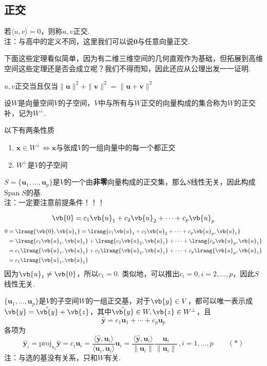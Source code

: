 \subsection{正交}
\begin{definition}[正交]
若$\langle u,v\rangle=0$，则称$u,v$正交.\\
注：与高中的定义不同，这里我们可以说$\mathbf{0}$与任意向量正交.
\end{definition}
下面这些定理看似简单，因为有二维三维空间的几何直观作为基础，但拓展到高维空间这些定理还是否会成立呢？我们不得而知，因此还应从公理出发一一证明.
\begin{theorem}
$u,v$正交当且仅当$\|\mathbf{u}\|^2+\|\mathbf{v}\|^2=\|\mathbf{u}+\mathbf{v}\|^2$
\end{theorem}
\begin{definition}
设$W$是向量空间$V$的子空间，$V$中与所有与$W$正交的向量构成的集合称为$W$的正交补，记为$W^\perp$.
\end{definition}
以下有两条性质
\begin{enumerate}
	\itemsep -3pt
	\item $\mathbf{x}\in W^\perp\iff\mathbf{x}$与张成$V$的一组向量中的每一个都正交
	\item $W^\perp$是$V$的子空间
\end{enumerate}
\begin{theorem}[正交必定线性无关]
\label{ortho_indep}
$S=\{\mathbf{u}_1,\dots,\mathbf{u}_p\}$是$V$的一个由\textbf{非零}向量构成的正交集，那么$S$线性无关，因此构成$\mathrm{Span}\;S$的基.\\
注：一定要注意前提条件！！！
\end{theorem}
\begin{analysis}
\[\vb{0}=c_1\vb{u}_1+c_2\vb{u}_2+\cdots+c_p\vb{u}_p\]
\[\begin{aligned}0&=\lrang{\vb{0},\vb{u}_1}=\lrang{c_1\vb{u}_1+c_2\vb{u}_2+\cdots+c_p\vb{u}_p,\vb{u}_1}\\
&=\lrang{c_1\vb{u}_1,\vb{u}_1}+\lrang{c_2\vb{u}_2,\vb{u}_1}+\cdots+\lrang{c_p\vb{u}_p,\vb{u}_1}\\
&=c_1\lrang{\vb{u}_1,\vb{u}_1}+c_2\lrang{\vb{u}_2,\vb{u}_1}+\cdots+c_p\lrang{\vb{u}_p,\vb{u}_1}\\
&=c_1\lrang{\vb{u}_1,\vb{u}_1}
\end{aligned}\]
因为$\vb{u}_1\ne\vb{0}$，所以$c_1=0$. 类似地，可以推出$c_i=0,i=2,\dots,p$，因此$S$线性无关.
\end{analysis}
\begin{theorem}[正交分解]
$\{\mathbf{u}_1,\dots,\mathbf{u}_p\}$是$V$的子空间$W$的一组正交基，对于$\vb{y}\in V$，都可以唯一表示成$\vb{y}=\hat{\vb{y}}+\vb{z}$，其中$\hat{\vb{y}}\in W,\vb{z}\in W^\perp$，且
\[\hat{\mathbf{y}}=c_1\mathbf{u}_1+\cdots+c_p\mathbf{u}_p\]
各项为
\[\hat{\mathbf{y}}_i=\mathrm{proj}_{u_i}\hat{\mathbf{y}}=c_i\mathbf{u}_i=\frac{\langle \hat{\mathbf{y}},\mathbf{u}_i\rangle}{\langle\mathbf{u}_i,\mathbf{u}_i\rangle}\mathbf{u}_i=\frac{\langle \hat{\mathbf{y}},\mathbf{u}_i\rangle}{\|\mathbf{u}_i\|}\frac{\mathbf{u}_i}{\|\mathbf{u}_i\|}\,,i=1,\dots,p\qquad(*)\]
注：与选的基没有关系，只和$W$有关.
\end{theorem}
